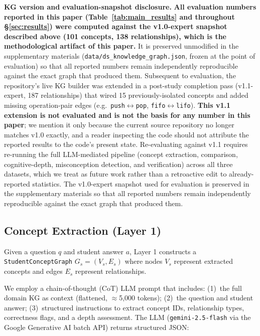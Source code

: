 \documentclass[conference]{IEEEtran}
\begin{document}
\textbf{KG version and evaluation-snapshot disclosure.} \textbf{All
evaluation numbers reported in this paper (Table~\ref{tab:main_results}
and throughout \S\ref{sec:results}) were computed against the v1.0-expert
snapshot described above (101 concepts, 138 relationships), which is the
methodological artifact of this paper.} It is preserved unmodified in the
supplementary materials (\texttt{data/ds\_knowledge\_graph.json}, frozen
at the point of evaluation) so that all reported numbers remain
independently reproducible against the exact graph that produced them.
Subsequent to evaluation, the repository's live KG builder was extended
in a post-study completion pass (v1.1-expert, 187 relationships) that
wired 15 previously-isolated concepts and added missing operation-pair
edges (e.g.\ \texttt{push}$\leftrightarrow$\texttt{pop},
\texttt{fifo}$\leftrightarrow$\texttt{lifo}). \textbf{This v1.1 extension
is not evaluated and is not the basis for any number in this paper}; we
mention it only because the current source repository no longer matches
v1.0 exactly, and a reader inspecting the code should not attribute the
reported results to the code's present state. Re-evaluating against v1.1
requires re-running the full LLM-mediated pipeline (concept extraction,
comparison, cognitive-depth, misconception detection, and verification)
across all three datasets, which we treat as future work rather than a
retroactive edit to already-reported statistics. The v1.0-expert snapshot
used for evaluation is preserved in the supplementary materials so that
all reported numbers remain independently reproducible against the
exact graph that produced them.

\subsection{Concept Extraction (Layer 1)}
\label{subsec:extraction}

Given a question $q$ and student answer $a$, Layer 1 constructs a
\texttt{StudentConceptGraph} $G_s = (V_s, E_s)$ where nodes $V_s$ represent
extracted concepts and edges $E_s$ represent relationships.

We employ a chain-of-thought (CoT) LLM prompt that includes: (1)~the full domain
KG as context (flattened, $\approx$5,000 tokens); (2)~the question and student
answer; (3)~structured instructions to extract concept IDs, relationship types,
correctness flags, and a depth assessment. The LLM (\texttt{gemini-2.5-flash}
via the Google Generative AI batch API) returns structured JSON:
\end{document}
